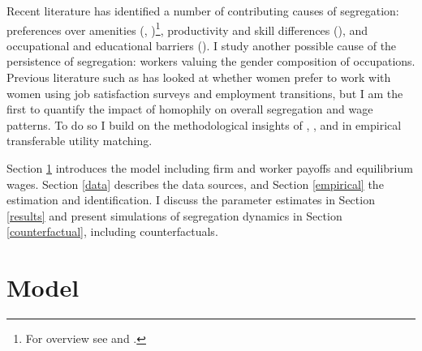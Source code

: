 \documentclass[12pt]{article}
\begin{document}


Recent literature has identified a number of contributing causes of segregation: preferences over amenities (, )\footnote{For overview see  and .}, productivity and skill differences (), and occupational and educational barriers (). I study another possible cause of the persistence of segregation: workers valuing the gender composition of occupations. Previous literature such as  has looked at whether women prefer to work with women using job satisfaction surveys and employment transitions, but I am the first to quantify the impact of homophily on overall segregation and wage patterns. To do so I build on the methodological insights of , , and  in empirical transferable utility matching.
 
Section \ref{model} introduces the model including firm and worker payoffs and equilibrium wages. Section \ref{data} describes the data sources, and Section \ref{empirical} the estimation and identification. I discuss the parameter estimates in Section \ref{results} and present simulations of segregation dynamics in Section \ref{counterfactual}, including counterfactuals. 



\section{Model} \label{model}




\end{document}
